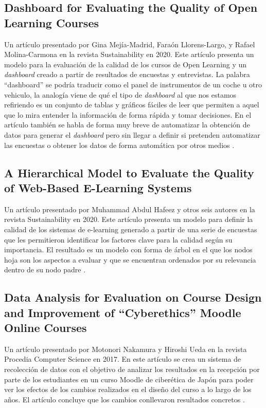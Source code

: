 \subsection{Dashboard for Evaluating the Quality of Open Learning Courses}
Un artículo presentado por Gina Mejía-Madrid, Faraón Llorens-Largo, y Rafael Molina-Carmona en la revista Sustainability en 2020.
Este artículo presenta un modelo para la evaluación de la calidad de los cursos de Open Learning y un \textit{dashboard} creado a partir de resultados de encuestas y entrevistas. La palabra ``dashboard'' se podría traducir como el panel de instrumentos de un coche u otro vehiculo, la analogía viene de qué el tipo de \textit{dashboard} al que nos estamos refiriendo es un conjunto de tablas y gráficos fáciles de leer que permiten a aquel que lo mira entender la información de forma rápida y tomar decisiones. En el artículo también se habla de forma muy breve de automatizar la obtención de datos para generar el \textit{dashboard} pero sin llegar a definir si pretenden automatizar las encuestas o obtener los datos de forma automática por otros medios \cite{mejia2020dashboard}.

\subsection{A Hierarchical Model to Evaluate the Quality of Web-Based E-Learning Systems}
Un artículo presentado por Muhammad Abdul Hafeez y otros seis autores en la revista Sustainability en 2020.
Este artículo presenta un modelo para definir la calidad de los sistemas de e-learning generado a partir de una serie de encuestas que les permitieron identificar los factores clave para la calidad según su importancia. El resultado es un modelo con forma de árbol en el que los nodos hoja son los aspectos a evaluar y que se encuentran ordenados por su relevancia dentro de su nodo padre \cite{muhammad2020hierarchical}.

\subsection{Data Analysis for Evaluation on Course Design and Improvement of “Cyberethics” Moodle Online Courses}
Un artículo presentado por Motonori Nakamura y Hiroshi Ueda en la revista Procedia Computer Science en 2017.
En este artículo se crea un sistema de recolección de datos con el objetivo de analizar los resultados en la recepción por parte de los estudiantes en un curso Moodle de ciberética de Japón para poder ver los efectos de los cambios realizados en el diseño del curso a lo largo de los años. El artículo concluye que los cambios conllevaron resultados concretos \cite{ueda2017data}.

